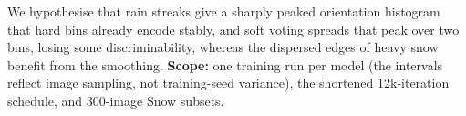 \documentclass[8pt,a4paper]{article}
\begin{document}
We hypothesise that rain streaks give a sharply peaked orientation histogram that hard bins already encode stably, and soft voting spreads that peak over two bins, losing some discriminability, whereas the dispersed edges of heavy snow benefit from the smoothing. \textbf{Scope:} one training run per model (the intervals reflect image sampling, not training-seed variance), the shortened 12k-iteration schedule, and 300-image Snow subsets.
\end{document}

